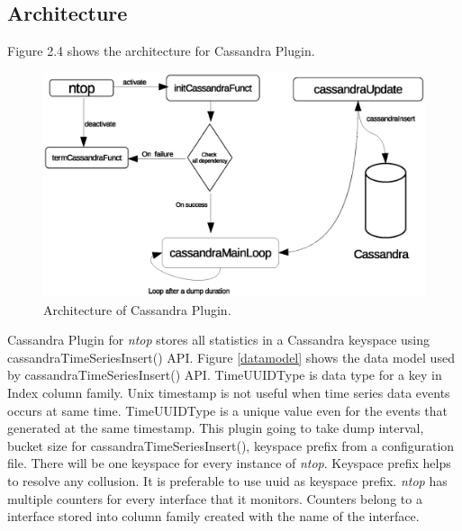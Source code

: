       \subsection{Architecture}
      Figure 2.4 shows the architecture for Cassandra Plugin. \\
           \begin{figure}[htb]
	    \centering
	    \includegraphics[scale = .7]{lfc}
	    \caption{Architecture of Cassandra Plugin.} 
	  \end{figure}
      Cassandra Plugin for \emph{ntop} stores all statistics in a Cassandra keyspace using cassandraTimeSeriesInsert() API.
      Figure \ref{datamodel} shows the data model used by cassandraTimeSeriesInsert() API. TimeUUIDType is data type for
      a key in Index column family. Unix timestamp is not useful when time series data events occurs at same time. TimeUUIDType is 
      a unique value even for the events that generated at the same timestamp. This plugin going to take dump interval, bucket size for
      cassandraTimeSeriesInsert(), keyspace prefix from a configuration file. There will be one keyspace for every instance of \emph{ntop}.
      Keyspace prefix helps to resolve any collusion. It is preferable to use uuid as keyspace prefix. \emph{ntop} has multiple counters
      for every interface that it monitors. Counters belong to a interface stored into column family created with the name of the interface.

